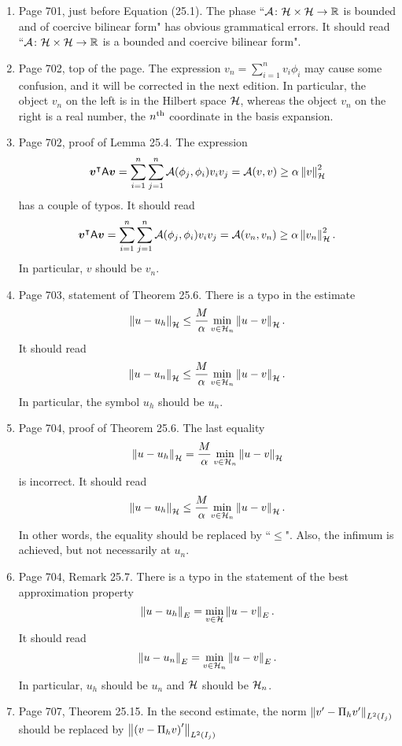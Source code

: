 \documentclass{book}
\begin{document}
	\begin{enumerate}
	
	\item
Page 701, just before Equation (25.1). The phase ``${\mathcal A}\colon{\mathcal H} \times {\mathcal H} \to \mathbb R$ is bounded and of coercive bilinear form" has obvious grammatical errors. It should read ``${\mathcal A}\colon{\mathcal H} \times {\mathcal H} \to \mathbb R$ is a bounded and coercive bilinear form".
	
	\item
Page 702, top of the page. The expression $v_n = \sum_{i=1}^n v_i \phi_i$ may cause some confusion, and it will be corrected in the next edition. In particular, the object $v_n$ on the left is in the Hilbert space ${\mathcal H}$, whereas the object $v_n$ on the right is a real number, the $n^{\rm th}$ coordinate in the basis expansion.

	\item
Page 702, proof of Lemma 25.4. The expression
\[
  \boldsymbol{v}^\intercal\mathsf{A}\boldsymbol{v} = \sum_{i=1}^n\sum_{j=1}^n {\mathcal A}(\phi_j,\phi_i) v_i v_j = {\mathcal A}(v,v) \ge \alpha\left\| v \right\|_{{\mathcal H}}^2
\]
has a couple of typos. It should read
\[
  \boldsymbol{v}^\intercal\mathsf{A}\boldsymbol{v} = \sum_{i=1}^n\sum_{j=1}^n {\mathcal A}(\phi_j,\phi_i) v_i v_j = {\mathcal A}(v_n,v_n) \ge \alpha\left\| v_n \right\|_{{\mathcal H}}^2.
\]
In particular, $v$ should be $v_n$.

	\item
Page 703, statement of Theorem 25.6. There is a typo in the estimate 
\[
  \left\| u-u_h \right\|_{{\mathcal H}} \le \frac{M}{\alpha} \min_{v\in {\mathcal H}_n}\left\| u-v \right\|_{{\mathcal H}} .
\]
It should read
\[
  \left\| u-u_n \right\|_{{\mathcal H}} \le \frac{M}{\alpha} \min_{v\in {\mathcal H}_n}\left\| u-v \right\|_{{\mathcal H}}.
\]
In particular, the symbol $u_h$ should be $u_n$.

	\item
Page 704, proof of Theorem 25.6.  The last equality 
	\[
\left\| u-u_h \right\|_{{\mathcal H}} = \frac{M}{\alpha}\min_{v\in {\mathcal H}_n} \left\| u-v \right\|_{{\mathcal H}}
	\]
is incorrect. It should read
	\[
\left\| u-u_h \right\|_{{\mathcal H}} \le \frac{M}{\alpha}\min_{v\in {\mathcal H}_n} \left\| u-v \right\|_{{\mathcal H}} .
	\]
In other words, the equality should be replaced by ``$\le$". Also, the infimum is achieved, but not necessarily at $u_n$.

	\item
Page 704, Remark 25.7. There is a typo in the statement of the best approximation property
\[
  \left\| u-u_h \right\|_E = \min_{v\in {\mathcal H}}\left\| u-v \right\|_E.
\]
It should read
\[
  \left\| u-u_n \right\|_E = \min_{v\in {\mathcal H}_n}\left\| u-v \right\|_E.
\]
In particular, $u_h$ should be $u_n$ and ${\mathcal H}$ should be ${\mathcal H}_n$.
	
	\item
Page 707, Theorem 25.15. In the second estimate, the norm $\left\| v'-\Pi_h v' \right\|_{L^2(I_j)}$ should be replaced by $\left\| \left(v-\Pi_h v \right)' \right\|_{L^2(I_j)}$
	

\end{enumerate}
\end{document}
